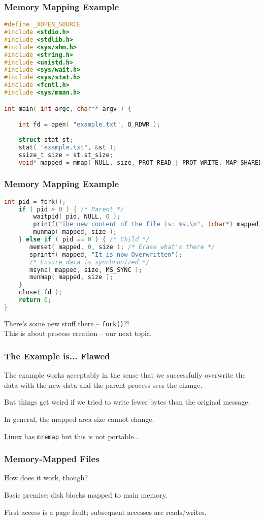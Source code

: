 \begin{frame}[fragile]
	\frametitle{Memory Mapping Example}

	\begin{lstlisting}[language=C]
#define _XOPEN_SOURCE
#include <stdio.h>
#include <stdlib.h>
#include <sys/shm.h>
#include <string.h>
#include <unistd.h>
#include <sys/wait.h>
#include <sys/stat.h>
#include <fcntl.h>
#include <sys/mman.h>

int main( int argc, char** argv ) { 

    int fd = open( "example.txt", O_RDWR );
    
    struct stat st; 
    stat( "example.txt", &st );
    ssize_t size = st.st_size;
    void* mapped = mmap( NULL, size, PROT_READ | PROT_WRITE, MAP_SHARED, fd, 0 );  
\end{lstlisting}
\end{frame}

\begin{frame}[fragile]
	\frametitle{Memory Mapping Example}

	\begin{lstlisting}[language=C]
    int pid = fork();
    if ( pid > 0 ) { /* Parent */
        waitpid( pid, NULL, 0 );
        printf("The new content of the file is: %s.\n", (char*) mapped);
        munmap( mapped, size );
    } else if ( pid == 0 ) { /* Child */
       memset( mapped, 0, size ); /* Erase what's there */
       sprintf( mapped, "It is now Overwritten");
       /* Ensure data is synchronized */
       msync( mapped, size, MS_SYNC );
       munmap( mapped, size );
    }
    close( fd );
    return 0;
}
\end{lstlisting}

There's some new stuff there -- \texttt{fork()}?!\\
\quad This is about process creation -- our next topic.

\end{frame}

\begin{frame}
	\frametitle{The Example is... Flawed}

	The example works acceptably in the sense that we successfully overwrite the data with the new data and the parent process sees the change.

	But things get weird if we tried to write fewer bytes than the original message.

	In general, the mapped area size cannot change.

	Linux has \texttt{mremap} but this is not portable...

\end{frame}

\begin{frame}
\frametitle{Memory-Mapped Files}

How does it work, though?

Basic premise: disk blocks mapped to main memory.

First access is a page fault; subsequent accesses are reads/writes.

\end{frame}






